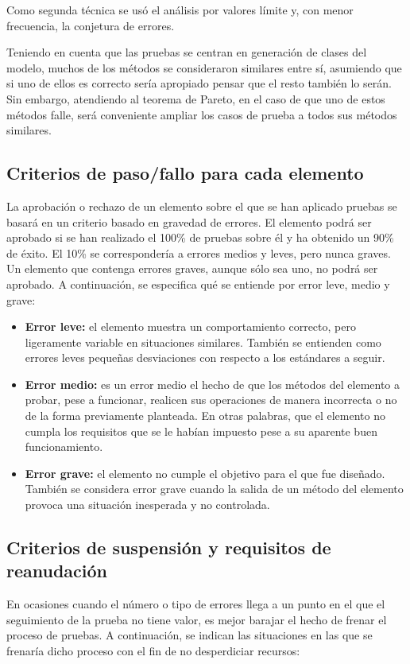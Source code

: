 \documentclass[10pt,a4paper]{article}
\begin{document}
		Como segunda técnica se usó el análisis por valores límite y, con menor frecuencia, la conjetura de errores.

		Teniendo en cuenta que las pruebas se centran en generación de clases del modelo, muchos de los métodos se consideraron similares entre sí, asumiendo que si uno de ellos es correcto sería apropiado pensar que el resto también lo serán. Sin embargo, atendiendo al teorema de Pareto, en el caso de que uno de estos métodos falle, será conveniente ampliar los casos de prueba a todos sus métodos similares.

	\subsection{Criterios de paso/fallo para cada elemento}
		La aprobación o rechazo de un elemento sobre el que se han aplicado pruebas se basará en un criterio basado en gravedad de errores. El elemento podrá ser aprobado si se han realizado el 100\% de pruebas sobre él y ha obtenido un 90\% de éxito. El 10\% se correspondería a errores medios y leves, pero nunca graves. Un elemento que contenga errores graves, aunque sólo sea uno, no podrá ser aprobado. A continuación, se especifica qué se entiende por error leve, medio y grave:
		
		\begin{itemize}
			\item \textbf{Error leve:} el elemento muestra un comportamiento correcto, pero ligeramente variable en situaciones similares. También se entienden como errores leves pequeñas desviaciones con respecto a los estándares a seguir.
			
			\item \textbf{Error medio:} es un error medio el hecho de que los métodos del elemento a probar, pese a funcionar, realicen sus operaciones de manera incorrecta o no de la forma previamente planteada. En otras palabras, que el elemento no cumpla los requisitos que se le habían impuesto pese a su aparente buen funcionamiento.
			
			\item \textbf{Error grave:} el elemento no cumple el objetivo para el que fue diseñado. También se considera error grave cuando la salida de un método del elemento provoca una situación inesperada y no controlada.
		\end{itemize}

	\subsection{Criterios de suspensión y requisitos de reanudación}
		En ocasiones cuando el número o tipo de errores llega a un punto en el que el seguimiento de la prueba no tiene valor, es mejor barajar el hecho de frenar el proceso de pruebas. A continuación, se indican las situaciones en las que se frenaría dicho proceso con el fin de no desperdiciar recursos:
		
\end{document}
